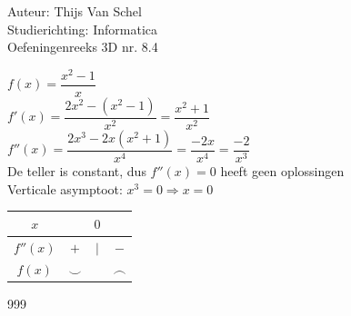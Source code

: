 \documentclass[a4paper]{article}
\begin{document}
  
\noindent \large Auteur: Thijs Van Schel \\
\noindent \large Studierichting: Informatica\\
\noindent \large Oefeningenreeks 3D nr. 8.4\\

\medskip

\normalsize

$f(x) = \dfrac{x^2-1}{x}$\\

$f'(x) = \dfrac{2x^2-(x^2-1)}{x^2} = \dfrac{x^2+1}{x^2}$\\

$f''(x) = \dfrac{2x^3-2x(x^2+1)}{x^4} = \dfrac{-2x}{x^4} = \dfrac{-2}{x^3}$\\

De teller is constant, dus $f''(x) = 0$ heeft geen oplossingen\\


Verticale asymptoot: $x^3 = 0 \Rightarrow x = 0$\\

\begin{tabular}{c|ccc}
$x$ & & $0$ & \\ \hline
$f''(x)$ & $+$ & $|$ & $-$ \\ \hline
$f(x)$ & $\smile$ & & $\frown$ \\
\end{tabular}

\begin{thebibliography}{999}
\end{thebibliography}
\end{document}
